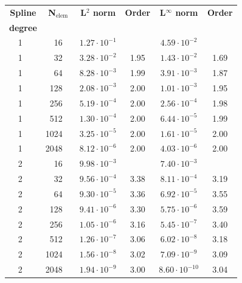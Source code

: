 \begin{table}[p]
 \begin{tabular}{|r c|r c|c|c|c|c|}
 \hline
 \multicolumn{2}{|c|}{\bf Spline} & \multicolumn{2}{|c|}{\bf N$_\text{elem}$} & \bf L$^2$ norm       & \bf Order & \bf L$^\infty$ norm  & \bf Order\\
 \multicolumn{2}{|c|}{\bf degree} &  & &        &  &   & \\
 \hline
 \hline
1  & &  16     & & $ 1.27 \cdot 10^{ -1 }$ &       & $ 4.59 \cdot 10^{ -2 }$ &  \\
\hline
1  & &  32     & & $ 3.28 \cdot 10^{ -2 }$ &  1.95  & $ 1.43 \cdot 10^{ -2 }$ &  1.69  \\
\hline
1  & &  64     & & $ 8.28 \cdot 10^{ -3 }$ &  1.99  & $ 3.91 \cdot 10^{ -3 }$ &  1.87  \\
\hline
1  & &  128     & & $ 2.08 \cdot 10^{ -3 }$ &  2.00  & $ 1.01 \cdot 10^{ -3 }$ &  1.95  \\
\hline
1  & &  256     & & $ 5.19 \cdot 10^{ -4 }$ &  2.00  & $ 2.56 \cdot 10^{ -4 }$ &  1.98  \\
\hline
1  & &  512     & & $ 1.30 \cdot 10^{ -4 }$ &  2.00  & $ 6.44 \cdot 10^{ -5 }$ &  1.99  \\
\hline
1  & &  1024     & & $ 3.25 \cdot 10^{ -5 }$ &  2.00  & $ 1.61 \cdot 10^{ -5 }$ &  2.00  \\
\hline
1  & &  2048     & & $ 8.12 \cdot 10^{ -6 }$ &  2.00  & $ 4.03 \cdot 10^{ -6 }$ &  2.00  \\
\hline
 \hline
2  & &  16     & & $ 9.98 \cdot 10^{ -3 }$ &       & $ 7.40 \cdot 10^{ -3 }$ &  \\
\hline
2  & &  32     & & $ 9.56 \cdot 10^{ -4 }$ &  3.38  & $ 8.11 \cdot 10^{ -4 }$ &  3.19  \\
\hline
2  & &  64     & & $ 9.30 \cdot 10^{ -5 }$ &  3.36  & $ 6.92 \cdot 10^{ -5 }$ &  3.55  \\
\hline
2  & &  128     & & $ 9.41 \cdot 10^{ -6 }$ &  3.30  & $ 5.75 \cdot 10^{ -6 }$ &  3.59  \\
\hline
2  & &  256     & & $ 1.05 \cdot 10^{ -6 }$ &  3.16  & $ 5.45 \cdot 10^{ -7 }$ &  3.40  \\
\hline
2  & &  512     & & $ 1.26 \cdot 10^{ -7 }$ &  3.06  & $ 6.02 \cdot 10^{ -8 }$ &  3.18  \\
\hline
2  & &  1024     & & $ 1.56 \cdot 10^{ -8 }$ &  3.02  & $ 7.09 \cdot 10^{ -9 }$ &  3.09  \\
\hline
2  & &  2048     & & $ 1.94 \cdot 10^{ -9 }$ &  3.00  & $ 8.60 \cdot 10^{ -10 }$ &  3.04  \\

\end{tabular}
\end{table}
